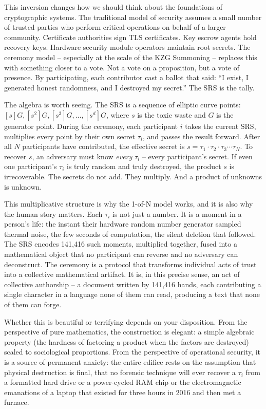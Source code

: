 \documentclass[
  11pt,
  openany]{report}
\begin{document}
This inversion changes how we should think about the foundations of
cryptographic systems. The traditional model of security assumes a small number
of trusted parties who perform critical operations on behalf of a larger
community. Certificate authorities sign TLS certificates. Key escrow agents hold
recovery keys. Hardware security module operators maintain root secrets. The
ceremony model -- especially at the scale of the KZG Summoning -- replaces this
with something closer to a vote. Not a vote on a proposition, but a vote of
presence. By participating, each contributor cast a ballot that said: ``I exist,
I generated honest randomness, and I destroyed my secret.'' The SRS is the
tally.

The algebra is worth seeing. The SRS is a sequence of elliptic curve points:
\([s]G, [s^2]G, [s^3]G, \ldots, [s^d]G\), where \(s\) is the toxic waste and
\(G\) is the generator point. During the ceremony, each participant \(i\) takes
the current SRS, multiplies every point by their own secret \(\tau_i\), and
passes the result forward. After all \(N\) participants have contributed, the
effective secret is \(s = \tau_1 \cdot \tau_2 \cdot \tau_3 \cdots \tau_N\). To
recover \(s\), an adversary must know \emph{every} \(\tau_i\) -- every
participant's secret. If even one participant's \(\tau_i\) is truly random and
truly destroyed, the product \(s\) is irrecoverable. The secrets do not add.
They multiply. And a product of unknowns is unknown.

This multiplicative structure is why the 1-of-N model works, and it is also why
the human story matters. Each \(\tau_i\) is not just a number. It is a moment in
a person's life: the instant their hardware random number generator sampled
thermal noise, the few seconds of computation, the silent deletion that
followed. The SRS encodes 141,416 such moments, multiplied together, fused into
a mathematical object that no participant can reverse and no adversary can
deconstruct. The ceremony is a protocol that transforms individual acts of trust
into a collective mathematical artifact. It is, in this precise sense, an act of
collective authorship -- a document written by 141,416 hands, each contributing
a single character in a language none of them can read, producing a text that
none of them can forge.

Whether this is beautiful or terrifying depends on your disposition. From the
perspective of pure mathematics, the construction is elegant: a simple algebraic
property (the hardness of factoring a product when the factors are destroyed)
scaled to sociological proportions. From the perspective of operational
security, it is a source of permanent anxiety: the entire edifice rests on the
assumption that physical destruction is final, that no forensic technique will
ever recover a \(\tau_i\) from a formatted hard drive or a power-cycled RAM chip
or the electromagnetic emanations of a laptop that existed for three hours in
2016 and then met a furnace.
\end{document}
